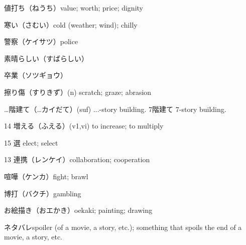 値打ち（ねうち）value; worth; price; dignity

寒い（さむい）cold (weather; wind); chilly

警察（ケイサツ）police

素晴らしい（すばらしい）

卒業（ソツギョウ）

擦り傷（すりきず）(n) scratch; graze; abrasion

…階建て（…カイだて）(suf) ...-story building.
7階建て 7-story building.

14 増える（ふえる）(v1,vi) to increase; to multiply

15 選 elect; select

13 連携（レンケイ）collaboration; cooperation

喧嘩（ケンカ）fight; brawl

博打（バクチ）gambling

お絵描き（おエかき）oekaki; painting; drawing

ネタバレspoiler (of a movie, a story, etc.); something that spoils the end of a movie, a story, etc.
